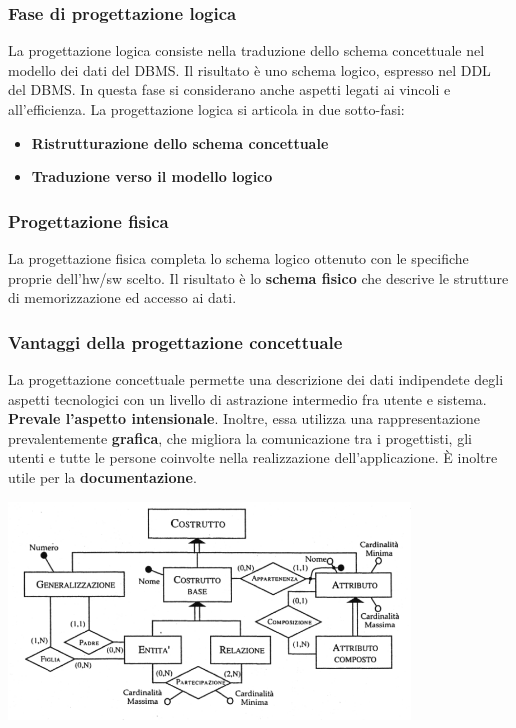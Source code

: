 \documentclass[12pt]{article}
\begin{document}
\subsubsection{Fase di progettazione logica}
La progettazione logica consiste nella traduzione dello schema concettuale nel modello dei dati del DBMS.
Il risultato è uno schema logico, espresso nel DDL del DBMS.
In questa fase si considerano anche aspetti legati ai vincoli e all'efficienza.
La progettazione logica si articola in due sotto-fasi:
\begin{itemize}
    \item \textbf{Ristrutturazione dello schema concettuale}
    \item \textbf{Traduzione verso il modello logico}
\end{itemize}
\subsubsection{Progettazione fisica}
La progettazione fisica completa lo schema logico ottenuto con le specifiche proprie dell'hw/sw scelto.
Il risultato è lo \textbf{schema fisico} che descrive le strutture di memorizzazione ed accesso ai dati.
\subsubsection{Vantaggi della progettazione concettuale}
La progettazione concettuale permette una descrizione dei dati indipendete degli aspetti tecnologici con un livello di astrazione intermedio fra utente e sistema.
\textbf{Prevale l'aspetto intensionale}.
Inoltre, essa utilizza una rappresentazione prevalentemente \textbf{grafica}, che migliora la comunicazione tra i progettisti, gli utenti e tutte le persone coinvolte nella realizzazione dell'applicazione.
È inoltre utile per la \textbf{documentazione}.
\begin{center}
    \includegraphics[width = 0.80\textwidth]{Images/14.PNG}
\end{center}
\end{document}

